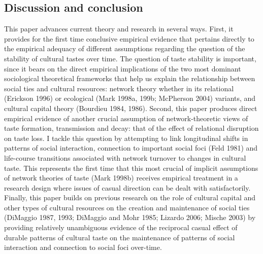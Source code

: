 \subsection{Discussion and conclusion}\label{discussion-and-conclusion}

This paper advances current theory and research in several ways. First, it provides for the first time conclusive empirical evidence that pertains directly to the empirical adequacy of different assumptions regarding the question of the stability of cultural tastes over time. The question of taste stability is important, since it bears on the direct empirical implications of the two most dominant sociological theoretical frameworks that help us explain the relationship between social ties and cultural resources: network theory whether in its relational (Erickson 1996) or ecological (Mark 1998a, 199b; McPherson 2004) variants, and cultural capital theory (Bourdieu 1984, 1986). Second, this paper produces direct empirical evidence of another crucial assumption of network-theoretic views of taste formation, transmission and decay: that of the effect of relational disruption on taste loss. I tackle this question by attempting to link longitudinal shifts in patterns of social interaction, connection to important social foci (Feld 1981) and life-course transitions associated with network turnover to changes in cultural taste. This represents the first time that this most crucial of implicit assumptions of network theories of taste (Mark 1998b) receives empirical treatment in a research design where issues of casual direction can be dealt with satisfactorily. Finally, this paper builds on previous research on the role of cultural capital and other types of cultural resources on the creation and maintenance of social ties (DiMaggio 1987, 1993; DiMaggio and Mohr 1985; Lizardo 2006; Mische 2003) by providing relatively unambiguous evidence of the reciprocal casual effect of durable patterns of cultural taste on the maintenance of patterns of social interaction and connection to social foci over-time.

